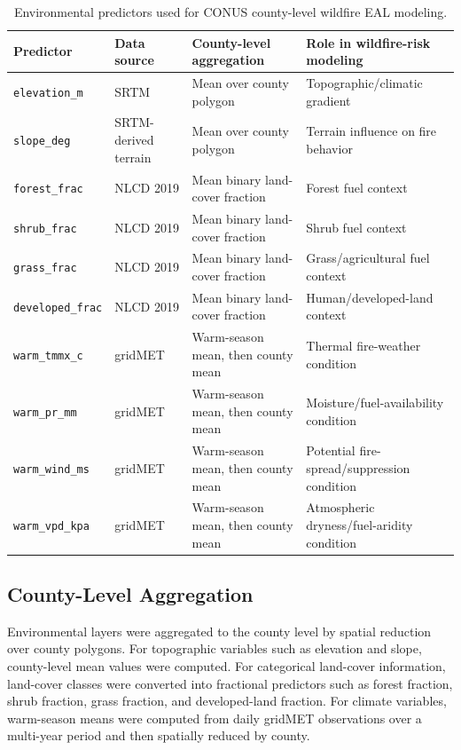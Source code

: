 \begin{table}[htbp]
\centering
\caption{Environmental predictors used for CONUS county-level wildfire EAL modeling.}
\label{tab:environmental_predictor_definitions_export}
\scriptsize
\setlength{\tabcolsep}{4pt}
\renewcommand{\arraystretch}{1.15}
\begin{tabularx}{\textwidth}{L{2.6cm} L{2.8cm} L{3.9cm} X}
\toprule
Predictor & Data source & County-level aggregation & Role in wildfire-risk modeling \\
\midrule
\texttt{elevation\_m} & SRTM & Mean over county polygon & Topographic/climatic gradient \\
\texttt{slope\_deg} & SRTM-derived terrain & Mean over county polygon & Terrain influence on fire behavior \\
\texttt{forest\_frac} & NLCD 2019 & Mean binary land-cover fraction & Forest fuel context \\
\texttt{shrub\_frac} & NLCD 2019 & Mean binary land-cover fraction & Shrub fuel context \\
\texttt{grass\_frac} & NLCD 2019 & Mean binary land-cover fraction & Grass/agricultural fuel context \\
\texttt{developed\_frac} & NLCD 2019 & Mean binary land-cover fraction & Human/developed-land context \\
\texttt{warm\_tmmx\_c} & gridMET & Warm-season mean, then county mean & Thermal fire-weather condition \\
\texttt{warm\_pr\_mm} & gridMET & Warm-season mean, then county mean & Moisture/fuel-availability condition \\
\texttt{warm\_wind\_ms} & gridMET & Warm-season mean, then county mean & Potential fire-spread/suppression condition \\
\texttt{warm\_vpd\_kpa} & gridMET & Warm-season mean, then county mean & Atmospheric dryness/fuel-aridity condition \\
\bottomrule
\end{tabularx}
\end{table}

\subsection{County-Level Aggregation}

Environmental layers were aggregated to the county level by spatial reduction over county polygons. For topographic variables such as elevation and slope, county-level mean values were computed. For categorical land-cover information, land-cover classes were converted into fractional predictors such as forest fraction, shrub fraction, grass fraction, and developed-land fraction. For climate variables, warm-season means were computed from daily gridMET observations over a multi-year period and then spatially reduced by county.

